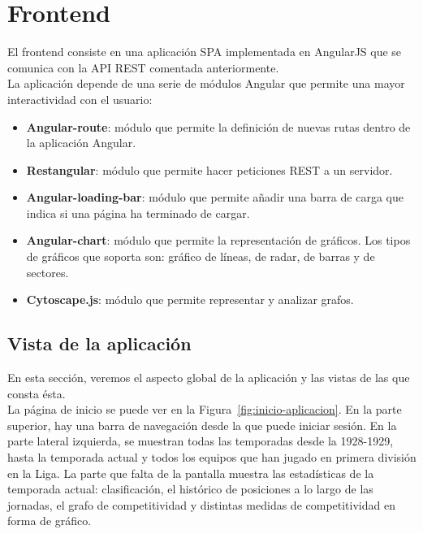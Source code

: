 \section{Frontend}

El frontend consiste en una aplicación SPA implementada en AngularJS que se comunica con la API REST comentada anteriormente.\\

La aplicación depende de una serie de módulos Angular que permite una mayor interactividad con el usuario:

\begin{itemize}
\item \textbf{Angular-route}: módulo que permite la definición de nuevas rutas dentro de la aplicación Angular.

\item \textbf{Restangular}: módulo que permite hacer peticiones REST a un servidor.

\item \textbf{Angular-loading-bar}: módulo que permite añadir una barra de carga que indica si una página ha terminado de cargar.

\item \textbf{Angular-chart}: módulo que permite la representación de gráficos. Los tipos de gráficos que soporta son: gráfico de líneas, de radar, de barras y de sectores.

\item \textbf{Cytoscape.js}: módulo que permite representar y analizar grafos.
\end{itemize} 

\subsection{Vista de la aplicación}

En esta sección, veremos el aspecto global de la aplicación y las vistas de las que consta ésta.\\

La página de inicio se puede ver en la Figura~\ref{fig:inicio-aplicacion}. En la parte superior, hay una barra de navegación desde la que puede iniciar sesión. En la parte lateral izquierda, se muestran todas las temporadas desde la 1928-1929, hasta la temporada actual y todos los equipos que han jugado en primera división en la Liga. La parte que falta de la pantalla muestra las estadísticas de la temporada actual: clasificación, el histórico de posiciones a lo largo de las jornadas, el grafo de competitividad y distintas medidas de competitividad en forma de gráfico.\\


